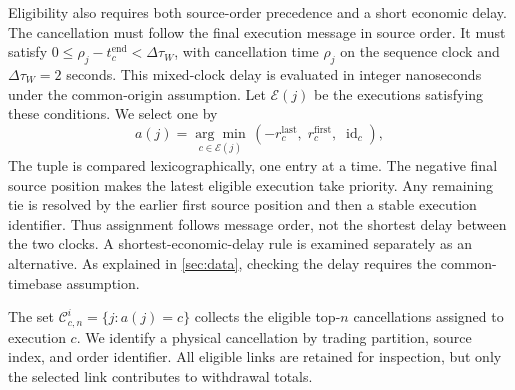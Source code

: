 \documentclass[11pt]{article}
\begin{document}
Eligibility also requires both source-order precedence and a short economic delay. The cancellation must follow the final execution message in source order. It must satisfy $0\leq \rho_j-t_c^{\mathrm{end}}<\Delta\tau_W$, with cancellation time $\rho_j$ on the sequence clock and $\Delta\tau_W=2$ seconds. This mixed-clock delay is evaluated in integer nanoseconds under the common-origin assumption. Let $\mathcal E(j)$ be the executions satisfying these conditions. We select one by
\begin{equation}
    a(j)=\underset{c\in\mathcal E(j)}{\arg\min}\,
    \left(-r_c^{\mathrm{last}},\;r_c^{\mathrm{first}},\;\operatorname{id}_c\right),
    \label{eq:canonical_cancel_assignment}
\end{equation}
The tuple is compared lexicographically, one entry at a time. The negative final source position makes the latest eligible execution take priority. Any remaining tie is resolved by the earlier first source position and then a stable execution identifier. Thus assignment follows message order, not the shortest delay between the two clocks. A shortest-economic-delay rule is examined separately as an alternative. As explained in \cref{sec:data}, checking the delay requires the common-timebase assumption.

The set $\mathcal{C}_{c,n}^{i}=\{j:a(j)=c\}$ collects the eligible top-$n$ cancellations assigned to execution $c$.
We identify a physical cancellation by trading partition, source index, and order identifier. All eligible links are
retained for inspection, but only the selected link contributes to withdrawal totals.
\end{document}
